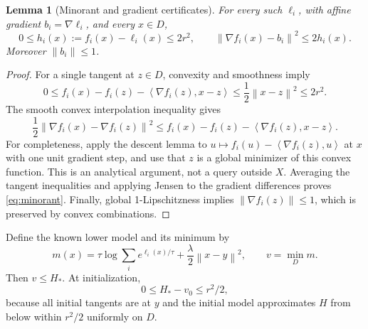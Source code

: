 \documentclass[11pt,a4paper]{article}
\newtheorem{lemma}[theorem]{Lemma}
\theoremstyle{definition}\newtheorem{definition}[theorem]{Definition}
\theoremstyle{remark}\newtheorem{remark}[theorem]{Remark}
\newcommand{\norm}[1]{\left\|#1\right\|}
\newcommand{\ip}[2]{\left\langle#1,#2\right\rangle}
\begin{document}
\begin{lemma}[Minorant and gradient certificates]\label{lem:minorant}
For every such $\ell_i$, with affine gradient $b_i=\nabla\ell_i$, and every $x\in D$,
\begin{equation}\label{eq:minorant}
 0\le h_i(x):=f_i(x)-\ell_i(x)\le2r^2,
 \qquad \norm{\nabla f_i(x)-b_i}^2\le2h_i(x).
\end{equation}
Moreover $\norm{b_i}\le1$.
\end{lemma}
\begin{proof}
For a single tangent at $z\in D$, convexity and smoothness imply
\[
 0\le f_i(x)-f_i(z)-\ip{\nabla f_i(z)}{x-z}
 \le\frac12\norm{x-z}^2\le2r^2.
\]
The smooth convex interpolation inequality gives
\[
 \frac12\norm{\nabla f_i(x)-\nabla f_i(z)}^2
 \le f_i(x)-f_i(z)-\ip{\nabla f_i(z)}{x-z}.
\]
For completeness, apply the descent lemma to
$u\mapsto f_i(u)-\ip{\nabla f_i(z)}{u}$ at $x$ with one unit gradient step, and use that $z$ is a global minimizer of this convex function. This is an analytical argument, not a query outside $X$. Averaging the tangent inequalities and applying Jensen to the gradient differences proves \eqref{eq:minorant}. Finally, global 1-Lipschitzness implies $\norm{\nabla f_i(z)}\le1$, which is preserved by convex combinations.
\end{proof}

Define the known lower model and its minimum by
\begin{equation}\label{eq:model}
 m(x)=\tau\log\sum_i e^{\ell_i(x)/\tau}
       +\frac\lambda2\norm{x-y}^2,\qquad v=\min_Dm.
\end{equation}
Then $v\le H_*$. At initialization,
\begin{equation}\label{eq:initial}
 0\le H_*-v_0\le r^2/2,
\end{equation}
because all initial tangents are at $y$ and the initial model approximates $H$ from below within $r^2/2$ uniformly on $D$.
\end{document}
